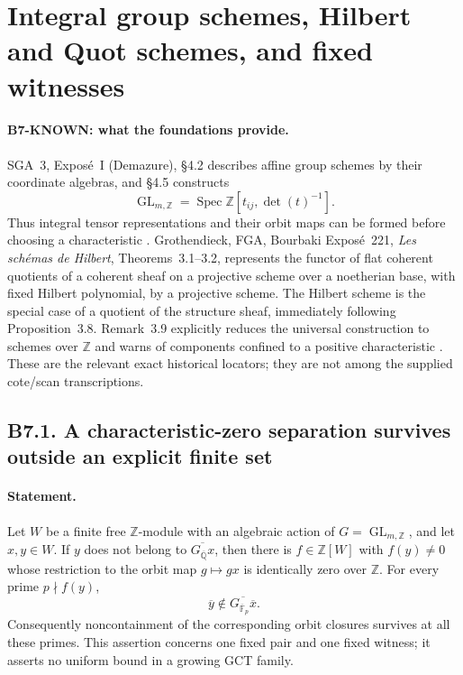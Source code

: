 \section{Integral group schemes, Hilbert and Quot schemes, and fixed witnesses}
\label{sec:bridge-integral}

\paragraph{B7-KNOWN: what the foundations provide.}
SGA~3, Expos\'e~I (Demazure), \S4.2 describes affine group schemes by
their coordinate algebras, and \S4.5 constructs
\[
 \operatorname{GL}_{m,\mathbb Z}
 =\operatorname{Spec}\mathbb Z[t_{ij},\det(t)^{-1}].
\]
Thus integral tensor representations and their orbit maps can be
formed before choosing a characteristic \cite{sga3-I}.
Grothendieck, FGA, Bourbaki Expos\'e~221,
\emph{Les sch\'emas de Hilbert}, Theorems~3.1--3.2, represents the
functor of flat coherent quotients of a coherent sheaf on a projective
scheme over a noetherian base, with fixed Hilbert polynomial, by a
projective scheme.  The Hilbert scheme is the special case of a
quotient of the structure sheaf, immediately following Proposition~3.8.
Remark~3.9 explicitly reduces the universal construction to schemes
over $\mathbb Z$ and warns of components confined to a positive
characteristic \cite{fga221}.  These are the relevant exact historical
locators; they are not among the supplied cote/scan transcriptions.

\subsection*{B7.1. A characteristic-zero separation survives outside an explicit finite set}
\paragraph{Statement.}
Let $W$ be a finite free $\mathbb Z$-module with an algebraic action of
$G=\operatorname{GL}_{m,\mathbb Z}$, and let $x,y\in W$.
If $y$ does not belong to $\overline{G_{\overline{\mathbb Q}}x}$,
then there is $f\in\mathbb Z[W]$ with $f(y)\neq0$ whose restriction
to the orbit map $g\mapsto gx$ is identically zero over $\mathbb Z$.
For every prime $p\nmid f(y)$,
\[
 \overline y\notin
 \overline{G_{\overline{\mathbb F}_p}\overline x}.
\]
Consequently noncontainment of the corresponding orbit closures
survives at all these primes.  This assertion concerns one fixed pair
and one fixed witness; it asserts no uniform bound in a growing GCT
family.
